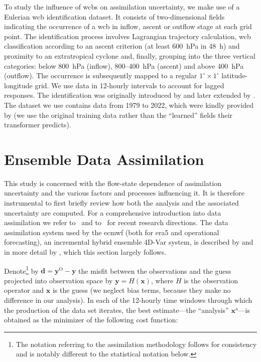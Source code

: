 To study the influence of \glspl{wcb} on assimilation uncertainty, we make use of a Eulerian \gls{wcb} identification dataset. It consists of two-dimensional fields indicating the occurrence of a \gls{wcb} in inflow, ascent or outflow stage at each grid point. The identification process involves Lagrangian trajectory calculation, \gls{wcb} classification according to an ascent criterion (at least 600~hPa in 48~h) and proximity to an extratropical cyclone and, finally, grouping into the three vertical categories: below 800~hPa (inflow), 800--400~hPa (ascent) and above 400~hPa (outflow). The occurrence is subsequently mapped to a regular $1^\circ \times 1^\circ$ latitude-longitude grid. We use data in 12-hourly intervals to account for lagged responses. The identification was originally introduced by \textcite{madonnaWarmConveyorBelts2014a} and later extended by \textcite{sprengerGlobalClimatologiesEulerian2017}. The dataset we use contains data from 1979 to 2022, which were kindly provided by \textcite{quintingEuLerianIdentificationAscending2022} (we use the original  training data rather than the \enquote{learned} fields their transformer predicts).

\section{Ensemble Data Assimilation}\label{sec:EDA_eda}
This study is concerned with the flow-state dependence of assimilation uncertainty and the various factors and processes influencing it. It is therefore instrumental to first briefly review how both the analysis and the associated uncertainty are computed. For a comprehensive introduction into data assimilation we refer to~\textcite{parkPrinciplesDataAssimilation2022} and to~\textcite{parkDataAssimilationAtmospheric2022} for recent research directions. The data assimilation system used by the \gls{ecmwf} (both for \gls{era5} and operational forecasting), an incremental hybrid ensemble 4D-Var system, is described by \textcite{hersbachERA5GlobalReanalysis2020} and in more detail by \textcite{bonavitaEvolutionECMWFHybrid2016}, which this section largely follows.

Denote\footnote{The notation referring to the assimilation methodology follows \textcite{ideUnifiedNotationData1997} for consistency and is notably different to the statistical notation below.} by $\mathbf{d} = \mathbf{y}^{\mathrm{O}} - \mathbf{y}$ the misfit between the observations and the guess projected into observation space by $\mathbf{y} = H(\mathbf{x})$, where $H$ is the observation operator and $\mathbf{x}$ is the guess
(we neglect bias terms, because they make no difference in our analysis). In each of the 12-hourly time windows through which the production of the data set iterates, the best estimate---the \enquote{analysis} $\mathbf{x}^{\mathrm{a}}$---is obtained as the minimizer of the following cost function:

